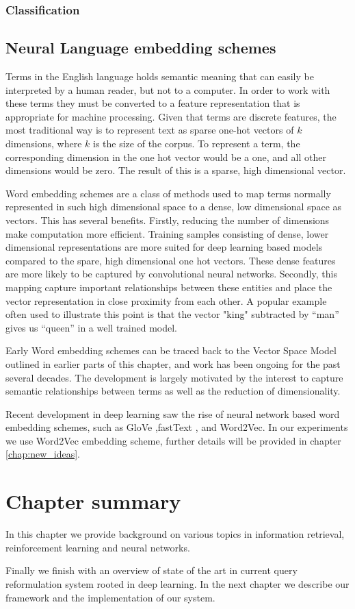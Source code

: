 \subsubsection{Classification}




\subsection{Neural Language embedding schemes}

Terms in the English language holds semantic meaning that can easily be interpreted by a human reader, but not to a computer. In order to work with these terms they must be converted to a feature representation that is appropriate for machine processing. Given that terms are discrete features, the most traditional way is to represent text as sparse one-hot vectors of $k$ dimensions, where $k$ is the size of the corpus. To represent a term, the corresponding dimension in the one hot vector would be a one, and all other dimensions would be zero. The result of this is a sparse, high dimensional vector. 

Word embedding schemes are a class of methods used to map terms normally represented in such high dimensional space to a dense, low dimensional space as vectors. This has several benefits. Firstly, reducing the number of dimensions make computation more efficient. Training samples consisting of dense, lower dimensional representations are more suited for deep learning based models compared to the spare, high dimensional one hot vectors. These dense features are more likely to be captured by convolutional neural networks. Secondly, this mapping capture important relationships between these entities and place the vector representation in close proximity from each other. A popular example often used to illustrate this point is that the vector "king" subtracted by ``man'' gives us ``queen'' in a well trained model.
 
Early Word embedding schemes can be traced back to the Vector Space Model outlined in earlier parts of this chapter, and work has been ongoing for the past several decades. The development is largely motivated by the interest to capture semantic relationships between terms as well as the reduction of dimensionality.  

Recent development in deep learning saw the rise of neural network based word embedding schemes, such as GloVe \cite{pennington2014glove},fastText \cite{bojanowski2017enriching}, and Word2Vec\cite{mikolov2013distributed}. In our experiments we use Word2Vec embedding scheme, further details will be provided in chapter \ref{chap:new_ideas}. 


\section{Chapter summary}

In this chapter we provide background on various topics in information retrieval, reinforcement learning and neural networks. 

Finally we finish with an overview of state of the art in current query reformulation system rooted in deep learning. In the next chapter we describe our framework and the implementation of our system.